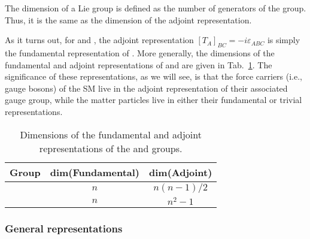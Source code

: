 \begin{definition}
\label{def:01_lie_group_dim}
The dimension of a Lie group is defined as the number of generators of the group.
Thus, it is the same as the dimension of the adjoint representation.
\end{definition}

As it turns out, for \so[3] and \su[2], the adjoint representation $[T_A]_{BC} = -i \varepsilon_{ABC}$ is simply the fundamental representation of \so[3].
More generally, the dimensions of the fundamental and adjoint representations of \SO[n] and \SU[n] are given in Tab.~\ref{tab:01_so_su_dimensions}.	
The significance of these representations, as we will see, is that the force carriers (i.e., gauge bosons) of the SM live in the adjoint representation of their associated gauge group, while the matter particles live in either their fundamental or trivial representations.

\begin{table}[ht!]
	\centering
	\renewcommand{\arraystretch}{1.5}
	\setlength{\tabcolsep}{10pt}
	\begin{tabular}{c|c|c}
		\textbf{Group} & \textbf{dim(Fundamental)} & \textbf{dim(Adjoint)} \\
		\hline
		\SO[n] & $n$ & $n(n-1)/2$ \\
		\SU[n] & $n$ & $n^2 - 1$ \\
	\end{tabular}
	\vspace{1em}
	\caption{Dimensions of the fundamental and adjoint representations of the \SO[n] and \SU[n] groups.}
	\label{tab:01_so_su_dimensions}
\end{table}

\subsubsection{General representations}

